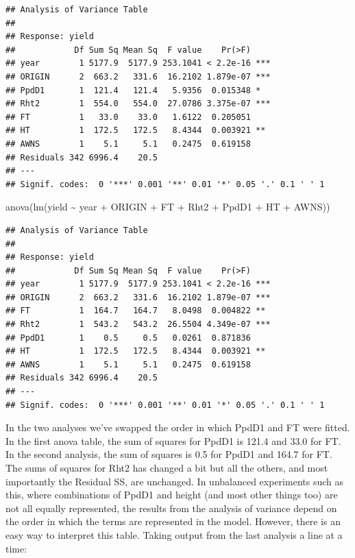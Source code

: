 \documentclass[
]{book}
\newenvironment{Shaded}{\begin{snugshade}}{\end{snugshade}}
\newcommand{\FunctionTok}[1]{\textcolor[rgb]{0.00,0.00,0.00}{#1}}
\newcommand{\NormalTok}[1]{#1}
\newcommand{\SpecialCharTok}[1]{\textcolor[rgb]{0.00,0.00,0.00}{#1}}
\begin{document}
\begin{verbatim}
## Analysis of Variance Table
## 
## Response: yield
##            Df Sum Sq Mean Sq  F value    Pr(>F)    
## year        1 5177.9  5177.9 253.1041 < 2.2e-16 ***
## ORIGIN      2  663.2   331.6  16.2102 1.879e-07 ***
## PpdD1       1  121.4   121.4   5.9356  0.015348 *  
## Rht2        1  554.0   554.0  27.0786 3.375e-07 ***
## FT          1   33.0    33.0   1.6122  0.205051    
## HT          1  172.5   172.5   8.4344  0.003921 ** 
## AWNS        1    5.1     5.1   0.2475  0.619158    
## Residuals 342 6996.4    20.5                       
## ---
## Signif. codes:  0 '***' 0.001 '**' 0.01 '*' 0.05 '.' 0.1 ' ' 1
\end{verbatim}

\begin{Shaded}
\begin{Highlighting}[]
\FunctionTok{anova}\NormalTok{(}\FunctionTok{lm}\NormalTok{(yield }\SpecialCharTok{\textasciitilde{}}\NormalTok{ year }\SpecialCharTok{+}\NormalTok{ ORIGIN }\SpecialCharTok{+}\NormalTok{ FT }\SpecialCharTok{+}\NormalTok{ Rht2 }\SpecialCharTok{+}\NormalTok{ PpdD1 }\SpecialCharTok{+}\NormalTok{ HT }\SpecialCharTok{+}\NormalTok{ AWNS))}
\end{Highlighting}
\end{Shaded}

\begin{verbatim}
## Analysis of Variance Table
## 
## Response: yield
##            Df Sum Sq Mean Sq  F value    Pr(>F)    
## year        1 5177.9  5177.9 253.1041 < 2.2e-16 ***
## ORIGIN      2  663.2   331.6  16.2102 1.879e-07 ***
## FT          1  164.7   164.7   8.0498  0.004822 ** 
## Rht2        1  543.2   543.2  26.5504 4.349e-07 ***
## PpdD1       1    0.5     0.5   0.0261  0.871836    
## HT          1  172.5   172.5   8.4344  0.003921 ** 
## AWNS        1    5.1     5.1   0.2475  0.619158    
## Residuals 342 6996.4    20.5                       
## ---
## Signif. codes:  0 '***' 0.001 '**' 0.01 '*' 0.05 '.' 0.1 ' ' 1
\end{verbatim}

In the two analyses we've swapped the order in which PpdD1 and FT were fitted. In the first anova table, the sum of squares for PpdD1 is 121.4 and 33.0 for FT. In the second analysis, the sum of squares is 0.5 for PpdD1 and 164.7 for FT. The sums of squares for Rht2 has changed a bit but all the others, and most importantly the Residual SS, are unchanged. In unbalanced experiments such as this, where combinations of PpdD1 and height (and most other things too) are not all equally represented, the results from the analysis of variance depend on the order in which the terms are represented in the model. However, there is an easy way to interpret this table. Taking output from the last analysis a line at a time:
\end{document}
